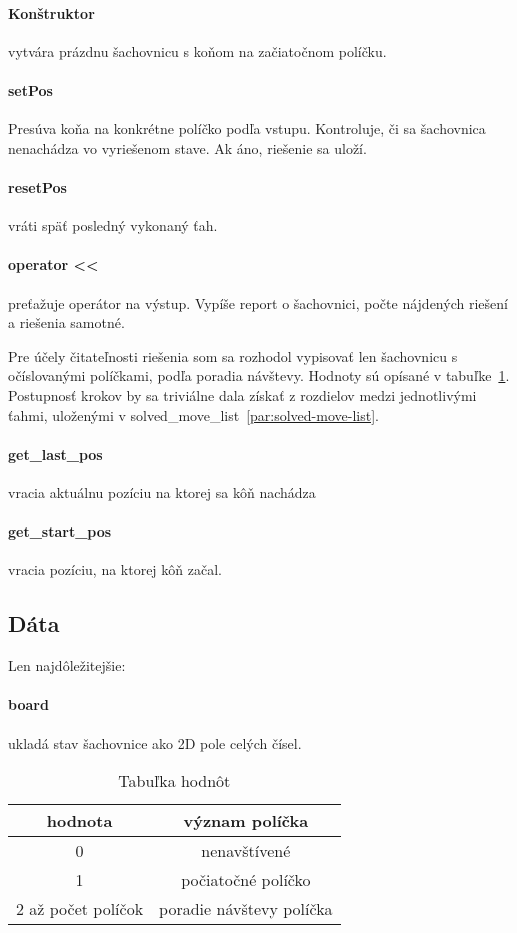 \paragraph{Konštruktor} vytvára prázdnu šachovnicu s koňom na začiatočnom
políčku.

\paragraph{setPos} Presúva koňa na konkrétne políčko podľa vstupu.
Kontroluje, či sa šachovnica nenachádza vo vyriešenom stave.
Ak áno, riešenie sa uloží.

\paragraph{resetPos} vráti späť posledný vykonaný ťah.

\paragraph{operator <<} preťažuje operátor na výstup.
Vypíše report o šachovnici, počte nájdených riešení a riešenia samotné.

Pre účely čitateľnosti riešenia som sa rozhodol vypisovať len šachovnicu
s očíslovanými políčkami, podľa poradia návštevy.
Hodnoty sú opísané v tabuľke~\ref{tab:tabuľka-hodnôt}.
Postupnosť krokov by sa triviálne dala získať z rozdielov medzi jednotlivými ťahmi,
uloženými v solved\_move\_list~\ref{par:solved-move-list}.

\paragraph{get\_last\_pos} vracia aktuálnu pozíciu na ktorej sa kôň nachádza

\paragraph{get\_start\_pos} vracia pozíciu, na ktorej kôň začal.

\subsection{Dáta}\label{subsec:dáta}
Len najdôležitejšie:

\paragraph{board}\label{par:board} ukladá stav šachovnice ako 2D pole celých čísel.
\begin{table}[!ht]
    \centering
    \caption{Tabuľka hodnôt}
    \label{tab:tabuľka-hodnôt}
    \begin{tabular}{cc}
        \toprule
        hodnota & význam políčka \\ \midrule
        0 & nenavštívené \\
        1 & počiatočné políčko \\
        2 až počet políčok & poradie návštevy políčka \\ \bottomrule
    \end{tabular}
\end{table}

